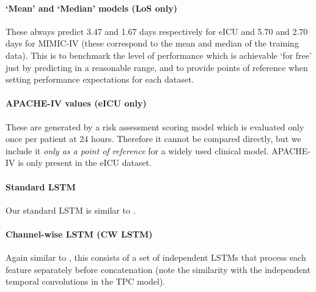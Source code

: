 \documentclass[sigconf]{acmart}
\begin{document}
\paragraph{`Mean' and `Median' models (LoS only)} 
These always predict 3.47 and 1.67 days respectively for eICU and 5.70 and 2.70 days for MIMIC-IV (these correspond to the mean and median of the training data). This is to benchmark the level of performance which is achievable `for free' just by predicting in a reasonable range, and to provide points of reference when setting performance expectations for each dataset. 
\paragraph{APACHE-IV values \citep{Zimmerman2006} (eICU only)}
These are generated by a risk assessment scoring model which is evaluated only once per patient at 24 hours. Therefore it cannot be compared directly, but we include it \textit{only as a point of reference} for a widely used clinical model. APACHE-IV is only present in the eICU dataset.
\paragraph{Standard LSTM}
Our standard LSTM is similar to \citet{harutyunyan}. 
\paragraph{Channel-wise LSTM (CW LSTM)}
Again similar to \citet{harutyunyan}, this consists of a set of independent LSTMs that process each feature separately before concatenation (note the similarity with the independent temporal convolutions in the TPC model). 
\end{document}
